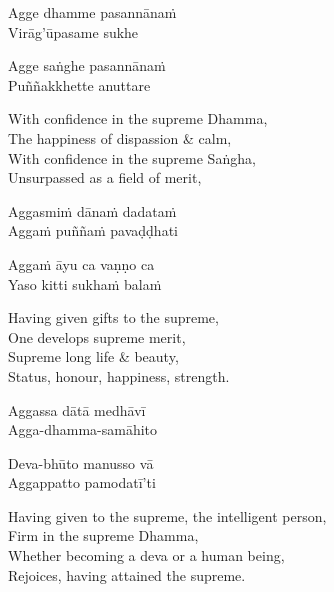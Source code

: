 \begin{pali-hang}
  Agge dhamme pasannānaṁ\\
  Virāg'ūpasame sukhe
\end{pali-hang}
\begin{pali-hang-together}
  Agge saṅghe pasannānaṁ\\
  Puññakkhette anuttare
\end{pali-hang-together}

\begin{english-verses}
  With confidence in the supreme Dhamma,\\
  The happiness of dispassion \& calm,\\
  With confidence in the supreme Saṅgha,\\
  Unsurpassed as a field of merit,
\end{english-verses}

\begin{pali-hang}
  Aggasmiṁ dānaṁ dadataṁ\\
  Aggaṁ puññaṁ pavaḍḍhati
\end{pali-hang}
\begin{pali-hang-together}
  Aggaṁ āyu ca vaṇṇo ca\\
  Yaso kitti sukhaṁ balaṁ
\end{pali-hang-together}

\ifbfiveversion\clearpage\fi

\begin{english-verses}
  Having given gifts to the supreme,\\
  One develops supreme merit,\\
  Supreme long life \& beauty,\\
  Status, honour, happiness, strength.
\end{english-verses}

\begin{pali-hang}
  Aggassa dātā medhāvī\\
  Agga-dhamma-samāhito
\end{pali-hang}
\begin{pali-hang-together}
  Deva-bhūto manusso vā\\
  Aggappatto pamodatī'ti
\end{pali-hang-together}

\begin{english-verses}
  Having given to the supreme, the intelligent person,\\
  Firm in the supreme Dhamma,\\
  Whether becoming a deva or a human being,\\
  Rejoices, having attained the supreme.
\end{english-verses}

